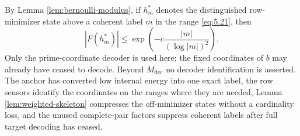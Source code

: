 By Lemma \ref{lem:bernoulli-modulus}, if $h_m^*$ denotes the distinguished row-minimizer state above a coherent label $m$ in the range \eqref{eq:5.21}, then
\[
|F(h_m^*)|
\le
\exp\!\left(-c\frac{|m|}{(\log|m|)^2}\right).
\tag{5.25}\label{eq:5.25}
\]
Only the prime-coordinate decoder is used here; the fixed coordinates of $b$ may already have ceased to decode. Beyond $M_{\mathrm{dec}}$ no decoder identification is asserted. The anchor has converted low internal energy into one exact label, the row sensors identify the coordinates on the ranges where they are needed, Lemma \ref{lem:weighted-skeleton} compresses the off-minimizer states without a cardinality loss, and the unused complete-pair factors suppress coherent labels after full target decoding has ceased.